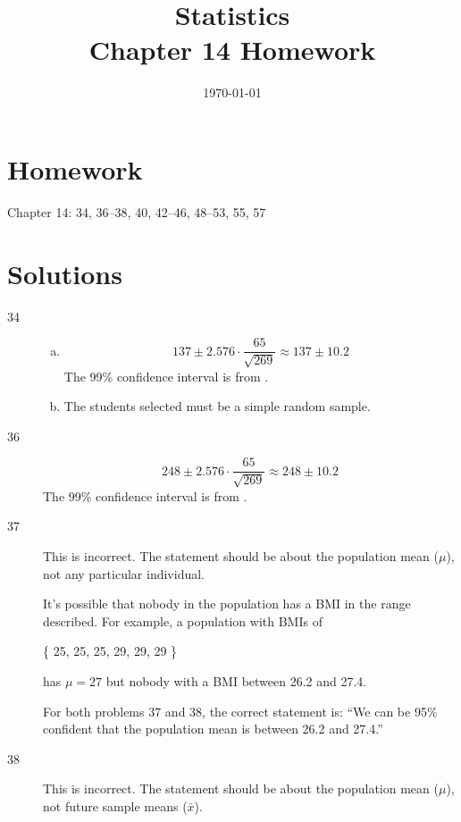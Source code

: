 \documentclass[letterpaper, landscape]{exam}
\title{Statistics \\ Chapter 14 Homework}
\date{\today}
\author{}
\begin{document}
  \maketitle

  \section{Homework}
  Chapter 14: 34, 36--38, 40, 42--46, 48--53, 55, 57

  \ifprintanswers{}
    \section{Solutions}
    \begin{description}

      \item[34] 
        \begin{enumerate}[(a)]
          \item 
            \[
              137 \pm 2.576 \cdot \frac{65}{\sqrt{269}} \approx 137 \pm 10.2
            \]
            The 99\% confidence interval is from .

          \item The students selected must be a simple random sample.

        \end{enumerate}

      \item[36] 
          \[
            248 \pm 2.576 \cdot \frac{65}{\sqrt{269}} \approx 248 \pm 10.2
          \]
          The 99\% confidence interval is from .

      \item[37] This is incorrect. The statement should be about the population
        mean ($\mu$), not any particular individual.

        It's possible that nobody in the population has a BMI in the range
        described. For example, a population with BMIs of 
        
        \{ 25, 25, 25, 29, 29, 29 \} 
        
        has $\mu = 27$ but nobody with a BMI between 26.2 and 27.4.

        For both problems 37 and 38, the correct statement is: ``We can be 95\%
        confident that the population mean is between 26.2 and 27.4.''

      \item[38] This is incorrect. The statement should be about the population
        mean ($\mu$), not future sample means ($\bar{x}$). 


\end{description}
\end{document}
